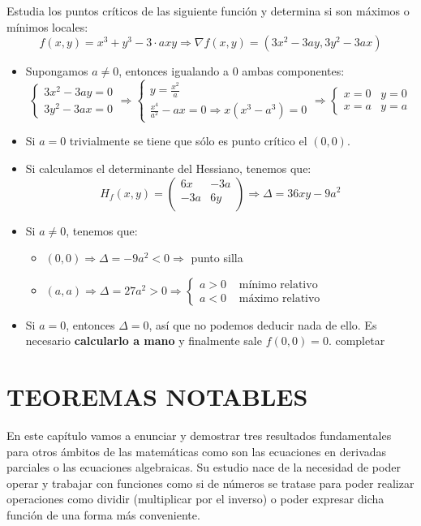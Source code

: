 \documentclass[10pt,a4paper,openright]{book}
\theoremstyle{break}
\begin{document}
Estudia los puntos críticos de las siguiente función y determina si son máximos o mínimos locales:
$$f(x,y) = x^3 + y^3 - 3 \cdot a xy \Rightarrow \nabla f(x,y) = (3x^2 - 3ay, 3y^2 - 3ax)$$
\begin{itemize}
\item Supongamos $a \neq 0$, entonces igualando a 0 ambas componentes:
$$\begin{cases} 3x^2 - 3ay = 0 \\ 3y^2 - 3ax = 0 \end{cases} \Rightarrow\begin{cases} y = \frac{x^2}{a} \\ \frac{x^4}{a^2} - ax = 0 \Rightarrow x (x^3 - a^3) = 0  \end{cases} \Rightarrow \begin{cases} x = 0 & y = 0 \\ x = a & y =a \end{cases}$$
\item Si $a = 0$ trivialmente se tiene que sólo es punto crítico el $(0,0)$.
\item Si calculamos el determinante del Hessiano, tenemos que:
$$H_f (x,y) = \begin{pmatrix} 6x & -3a \\ -3a & 6y  \\ \end{pmatrix} \Rightarrow \Delta = 36 xy - 9 a^2$$

\item Si $a \neq 0$, tenemos que:
\begin{itemize}
\item $(0,0) \Rightarrow \Delta = -9a^2 < 0 \Rightarrow $ punto silla
\item $(a,a) \Rightarrow \Delta = 27a^2 > 0 \Rightarrow \begin{cases} a > 0 & \mbox{ mínimo relativo} \\ a < 0 & \mbox{ máximo relativo} \end{cases}$
\end{itemize}

\item Si $a = 0$, entonces $\Delta = 0$, así que no podemos deducir nada de ello. Es necesario \textbf{calcularlo a mano} y finalmente sale $f(0,0) = 0$.
completar
\end{itemize}

\chapter*{TEOREMAS NOTABLES}
En este capítulo vamos a enunciar y demostrar tres resultados fundamentales para otros ámbitos de las matemáticas como son las ecuaciones en derivadas parciales o las ecuaciones algebraicas. Su estudio nace de la necesidad de poder operar y trabajar con funciones como si de números se tratase para poder realizar operaciones como dividir (multiplicar por el inverso) o poder expresar dicha función de una forma más conveniente.
\end{document}
